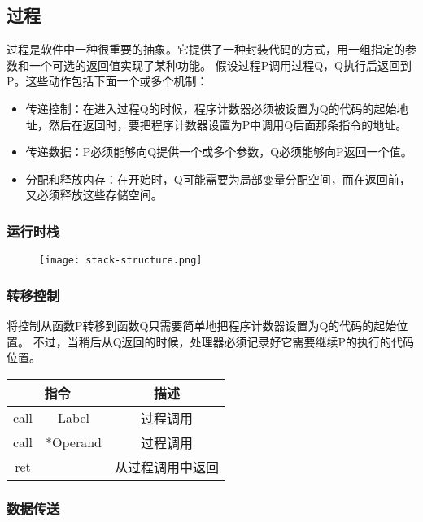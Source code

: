 \subsection{过程}

过程是软件中一种很重要的抽象。它提供了一种封装代码的方式，用一组指定的参数和一个可选的返回值实现了某种功能。
假设过程P调用过程Q，Q执行后返回到P。这些动作包括下面一个或多个机制：

\begin{itemize}
    \item 传递控制：在进入过程Q的时候，程序计数器必须被设置为Q的代码的起始地址，然后在返回时，要把程序计数器设置为P中调用Q后面那条指令的地址。
    \item 传递数据：P必须能够向Q提供一个或多个参数，Q必须能够向P返回一个值。
    \item 分配和释放内存：在开始时，Q可能需要为局部变量分配空间，而在返回前，又必须释放这些存储空间。
\end{itemize}

\subsubsection{运行时栈}
\begin{figure}[H]
\centering
\texttt{[image: stack-structure.png]}
\end{figure}

\subsubsection{转移控制}

将控制从函数P转移到函数Q只需要简单地把程序计数器设置为Q的代码的起始位置。
不过，当稍后从Q返回的时候，处理器必须记录好它需要继续P的执行的代码位置。

\begin{table}[H]
    \centering
    \begin{tabular}{|c c|c|}
        \hline
        \multicolumn{2}{|c|}{\textbf{指令}} & \textbf{描述} \\
        \hline
        call & Label & 过程调用 \\
        call & *Operand & 过程调用 \\
        \hline
        ret &  & 从过程调用中返回 \\
        \hline
    \end{tabular}
\end{table}

\subsubsection{数据传送}


